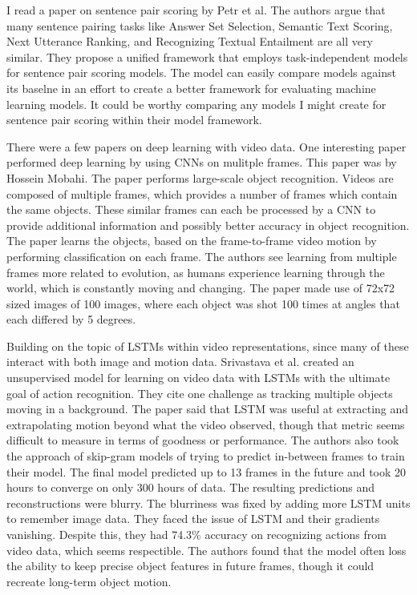 I read a paper on sentence pair scoring by Petr et al.  The authors argue that many sentence pairing tasks like Answer Set Selection, Semantic Text Scoring, Next Utterance Ranking, and Recognizing Textual Entailment are all very similar.  They propose a unified framework that employs task-independent models for sentence pair scoring models.  The model can easily compare models against its baselne in an effort to create a better framework for evaluating machine learning models.  It could be worthy comparing any models I might create for sentence pair scoring within their model framework.

There were a few papers on deep learning with video data.  One interesting paper performed deep learning by using CNNs on mulitple frames.  This paper was by Hossein Mobahi.  The paper performs large-scale object recognition.  Videos are composed of multiple frames, which provides a number of frames which contain the same objects.  These similar frames can each be processed by a CNN to provide additional information and possibly better accuracy in object recognition.  The paper learns the objects, based on the frame-to-frame video motion by performing classification on each frame.  The authors see learning from multiple frames more related to evolution, as humans experience learning through the world, which is constantly moving and changing.  The paper made use of 72x72 sized images of 100 images, where each object was shot 100 times at angles that each differed by 5 degrees.

Building on the topic of LSTMs within video representations, since many of these interact with both image and motion data.  Srivastava et al. created an unsupervised model for learning on video data with LSTMs with the ultimate goal of action recognition.  They cite one challenge as tracking multiple objects moving in a background.  The paper said that LSTM was useful at extracting and extrapolating motion beyond what the video observed, though that metric seems difficult to measure in terms of goodness or performance. The authors also took the approach of skip-gram models of trying to predict in-between frames to train their model. The final model predicted up to 13 frames in the future and took 20 hours to converge on only 300 hours of data. The resulting predictions and reconstructions were blurry.  The blurriness was fixed by adding more LSTM units to remember image data.  They faced the issue of LSTM and their gradients vanishing.  Despite this, they had 74.3\% accuracy on recognizing actions from video data, which seems respectible.  The authors found that the model often loss the ability to keep precise object features in future frames, though it could recreate long-term object motion. 

